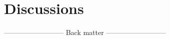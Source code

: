 \documentclass[%
    paper=A4,                   %
    twoside=true,               %
    openright,                  %
    parskip=full,               %
    chapterprefix=true,         %
    11pt,                       %
    headings=normal,            %
    bibliography=totoc,         %
    listof=totoc,               %
    titlepage=on,               %
    captions=tableabove,        %
    draft=false,                %
]{scrreprt}%
\begin{document}




\part{Discussions} %





\cleardoublepage

--------------------------
Back matter
--------------------------



{%
\renewcommand{\bibfont}{\normalfont\small}
\setlength{\biblabelsep}{0pt}
\setlength{\bibitemsep}{0.5\baselineskip plus 0.5\baselineskip}
\printbibliography[nottype=online]
}



% 



% 

% 

\end{document}
